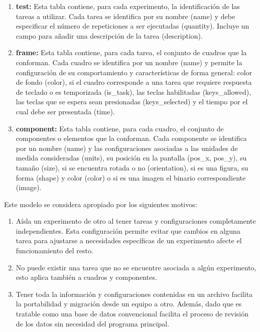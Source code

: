 \documentclass[\main/main.tex]{subfiles}
\begin{document}
\begin{enumerate}
			\item \textbf{test:} Esta tabla contiene, para cada experimento, la identificación de las tareas a utilizar. Cada tarea se identifica por su nombre (name) y debe especificar el número de repeticiones a ser ejecutadas (quantity). Incluye un campo para añadir una descripción de la tarea (description).

			\item \textbf{frame:} Esta tabla contiene, para cada tarea, el conjunto de cuadros que la conforman. Cada cuadro se identifica por un nombre (name) y permite la configuración de su comportamiento y características de forma general: color de fondo (color), si el cuadro corresponde a una tarea que requiere respuesta de teclado o es temporizada (is\_task), las teclas habilitadas (keys\_allowed), las teclas que se espera sean presionadas (keys\_selected) y el tiempo por el cual debe ser presentada (time).

			\item \textbf{component:} Esta tabla contiene, para cada cuadro, el conjunto de componentes o elementos que la conforman. Cada componente se identifica por un nombre (name) y las configuraciones asociadas a las unidades de medida consideradas (units), su posición en la pantalla (pos\_x, pos\_y), su tamaño (size), si se encuentra rotada o no (orientation), si es una figura, su forma (shape) y color (color) o si es una imagen el binario correspondiente (image). 
		\end{enumerate}

		Este modelo se considera apropiado por los siguientes motivos:
		\begin{enumerate}
			\item Aísla un experimento de otro al tener tareas y configuraciones completamente independientes. Esta configuración permite evitar que cambios en alguna tarea para ajustarse a necesidades específicas de un experimento afecte el funcionamiento del resto.

			\item No puede existir una tarea que no se encuentre asociada a algún experimento, esto aplica también a cuadros y componentes. 

			\item Tener toda la información y configuraciones contenidas en un archivo facilita la portabilidad y migración desde un equipo a otro. Además, dado que es tratable como una base de datos convencional facilita el proceso de revisión de los datos sin necesidad del programa principal.
		\end{enumerate}
\end{document}
